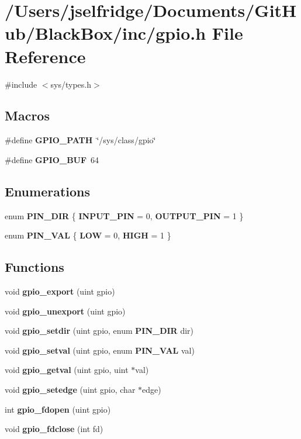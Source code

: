 \section{/\+Users/jselfridge/\+Documents/\+Git\+Hub/\+Black\+Box/inc/gpio.h File Reference}
\label{gpio_8h}
{\ttfamily \#include $<$sys/types.\+h$>$}\newline
\subsection*{Macros}
\begin{DoxyCompactItemize}
\item 
\#define \textbf{ G\+P\+I\+O\+\_\+\+P\+A\+TH}~\char`\"{}/sys/class/gpio\char`\"{}
\item 
\#define \textbf{ G\+P\+I\+O\+\_\+\+B\+UF}~64
\end{DoxyCompactItemize}
\subsection*{Enumerations}
\begin{DoxyCompactItemize}
\item 
enum \textbf{ P\+I\+N\+\_\+\+D\+IR} \{ \textbf{ I\+N\+P\+U\+T\+\_\+\+P\+IN} = 0, 
\textbf{ O\+U\+T\+P\+U\+T\+\_\+\+P\+IN} = 1
 \}
\item 
enum \textbf{ P\+I\+N\+\_\+\+V\+AL} \{ \textbf{ L\+OW} = 0, 
\textbf{ H\+I\+GH} = 1
 \}
\end{DoxyCompactItemize}
\subsection*{Functions}
\begin{DoxyCompactItemize}
\item 
void \textbf{ gpio\+\_\+export} (uint gpio)
\item 
void \textbf{ gpio\+\_\+unexport} (uint gpio)
\item 
void \textbf{ gpio\+\_\+setdir} (uint gpio, enum \textbf{ P\+I\+N\+\_\+\+D\+IR} dir)
\item 
void \textbf{ gpio\+\_\+setval} (uint gpio, enum \textbf{ P\+I\+N\+\_\+\+V\+AL} val)
\item 
void \textbf{ gpio\+\_\+getval} (uint gpio, uint $\ast$val)
\item 
void \textbf{ gpio\+\_\+setedge} (uint gpio, char $\ast$edge)
\item 
int \textbf{ gpio\+\_\+fdopen} (uint gpio)
\item 
void \textbf{ gpio\+\_\+fdclose} (int fd)
\end{DoxyCompactItemize}


